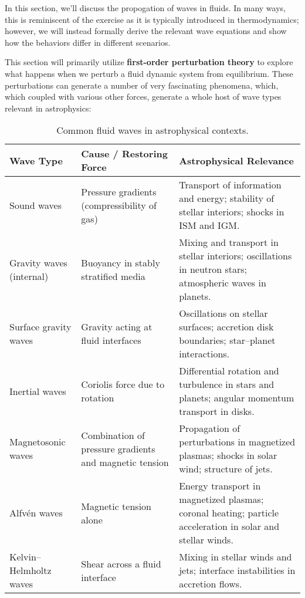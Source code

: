 In this section, we'll discuss the propogation of waves in fluids. In many ways, this is reminiscent of the exercise as it is typically introduced in thermodynamics; however, we will instead formally derive the relevant wave equations and show how the behaviors differ in different scenarios.

This section will primarily utilize \textbf{first-order perturbation theory} to explore what happens when we perturb a fluid dynamic system from equilibrium. These perturbations can generate a number of very fascinating phenomena, which, which coupled with various other forces, generate a whole host of wave types relevant in astrophysics:
\vspace{0.5cm}
\begin{table}[h!]
\centering
\caption{Common fluid waves in astrophysical contexts.}
\begin{tabular}{l p{5cm} p{5cm}}
\hline
\textbf{Wave Type} & \textbf{Cause / Restoring Force} & \textbf{Astrophysical Relevance} \\
\hline
Sound waves & Pressure gradients (compressibility of gas) & Transport of information and energy; stability of stellar interiors; shocks in ISM and IGM. \\
Gravity waves (internal) & Buoyancy in stably stratified media & Mixing and transport in stellar interiors; oscillations in neutron stars; atmospheric waves in planets. \\
Surface gravity waves & Gravity acting at fluid interfaces & Oscillations on stellar surfaces; accretion disk boundaries; star–planet interactions. \\
Inertial waves & Coriolis force due to rotation & Differential rotation and turbulence in stars and planets; angular momentum transport in disks. \\
Magnetosonic waves & Combination of pressure gradients and magnetic tension & Propagation of perturbations in magnetized plasmas; shocks in solar wind; structure of jets. \\
Alfvén waves & Magnetic tension alone & Energy transport in magnetized plasmas; coronal heating; particle acceleration in solar and stellar winds. \\
Kelvin–Helmholtz waves & Shear across a fluid interface & Mixing in stellar winds and jets; interface instabilities in accretion flows. \\
\hline
\end{tabular}
\end{table}
\vspace{0.5cm}

